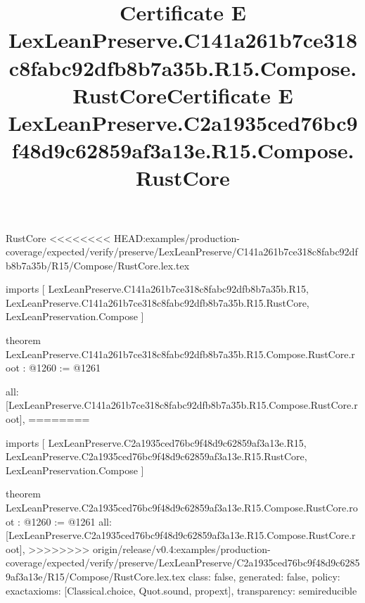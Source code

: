 \begin{lexlean}{RustCore}
<<<<<<<< HEAD:examples/production-coverage/expected/verify/preserve/LexLeanPreserve/C141a261b7ce318c8fabc92dfb8b7a35b/R15/Compose/RustCore.lex.tex
\title{Certificate E LexLeanPreserve.C141a261b7ce318c8fabc92dfb8b7a35b.R15.Compose.RustCore}
\begin{coremodule}
imports [
  LexLeanPreserve.C141a261b7ce318c8fabc92dfb8b7a35b.R15,
  LexLeanPreserve.C141a261b7ce318c8fabc92dfb8b7a35b.R15.RustCore,
  LexLeanPreservation.Compose
]

theorem LexLeanPreserve.C141a261b7ce318c8fabc92dfb8b7a35b.R15.Compose.RustCore.root : @1260 := @1261 {
  all: [LexLeanPreserve.C141a261b7ce318c8fabc92dfb8b7a35b.R15.Compose.RustCore.root],
========
\title{Certificate E LexLeanPreserve.C2a1935ced76bc9f48d9c62859af3a13e.R15.Compose.RustCore}
\begin{coremodule}
imports [
  LexLeanPreserve.C2a1935ced76bc9f48d9c62859af3a13e.R15,
  LexLeanPreserve.C2a1935ced76bc9f48d9c62859af3a13e.R15.RustCore,
  LexLeanPreservation.Compose
]

theorem LexLeanPreserve.C2a1935ced76bc9f48d9c62859af3a13e.R15.Compose.RustCore.root : @1260 := @1261 {
  all: [LexLeanPreserve.C2a1935ced76bc9f48d9c62859af3a13e.R15.Compose.RustCore.root],
>>>>>>>> origin/release/v0.4:examples/production-coverage/expected/verify/preserve/LexLeanPreserve/C2a1935ced76bc9f48d9c62859af3a13e/R15/Compose/RustCore.lex.tex
  class: false,
  generated: false,
  policy: exact{axioms: [Classical.choice, Quot.sound, propext]},
  transparency: semireducible
}


\end{coremodule}}
\end{coremodule}
\end{lexlean}

